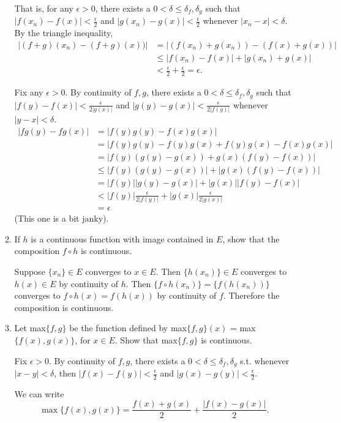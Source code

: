 \begin{enumerate}
\begin{enumerate}[label=(\roman*),align=left]
		\par
		That is, for any $\epsilon>0$, there exists a $0<\delta\le \delta_f,\delta_g$ such that
		$|f(x_n)-f(x)|<\frac{\epsilon}{2}$ and $|g(x_n)-g(x)|<\frac{\epsilon}{2}$ whenever $|x_n-x|<\delta$.
		By the triangle inequality,
		\begin{align*}
			|(f+g)(x_n)-(f+g)(x))| &= |(f(x_n)+g(x_n))-(f(x)+g(x))| \\
			&\le |f(x_n)-f(x)|+|g(x_n)+g(x)| \\
			&< \frac{\epsilon}{2} + \frac{\epsilon}{2} = \epsilon.
		\end{align*}
        \par
		Fix any $\epsilon>0$. By continuity of $f,g$, there exists a $0<\delta\le \delta_f,\delta_g$ such that
		$|f(y)-f(x)|<\frac{\epsilon}{2|g(x)|}$ and $|g(y)-g(x)|<\frac{\epsilon}{2|f(y)|}$ whenever $|y-x|<\delta$.
		\begin{align*}
			|fg(y)-fg(x)| &= |f(y)g(y)-f(x)g(x)|\\
			&=|f(y)g(y)-f(y)g(x)+f(y)g(x)-f(x)g(x)|\\
			&=|f(y)(g(y)-g(x))+g(x)(f(y)-f(x))|\\
			&\le|f(y)(g(y)-g(x))|+|g(x)(f(y)-f(x))|\\
			&=|f(y)||g(y)-g(x)|+|g(x)||f(y)-f(x)|\\
			&<|f(y)|\frac{\epsilon}{2|f(y)|}+|g(x)|\frac{\epsilon}{2|g(x)|}\\
			&=\epsilon
		\end{align*}
        (This one is a bit janky).
        \item If $h$ is a continuous function with image contained in $E$, show that the composition $f \circ h$ is continuous.\par
        Suppose $\{x_n\}\in E$ converges to $x\in E$.
		Then $\{h(x_n)\}\in E$ converges to $h(x)\in E$ by continuity of $h$.
		Then $\{f\circ h(x_n)\}=\{f(h(x_n))\}$ converges to $f\circ h(x) = f(h(x))$ by continuity of $f$.
		Therefore the composition is continuous.
        \item Let max$\{f,g\}$ be the function defined by max$\{f,g\}(x)$ = max$\{f(x),g(x)\}$, for $x \in E$. Show that max$\{f,g\}$ is continuous.\par
        Fix $\epsilon>0$. By continuity of $f,g$, there exists a $0<\delta\le\delta_f,\delta_g$ s.t. whenever $|x-y|<\delta$, then $|f(x)-f(y)|<\frac{\epsilon}{2}$ and $|g(x)-g(y)|<\frac{\epsilon}{2}$.
		\par
		We can write
		\[
			\max\{f(x),g(x)\} = \frac{f(x)+g(x)}{2}+\frac{|f(x)-g(x)|}{2}.
\]
\end{enumerate}
\end{enumerate}
